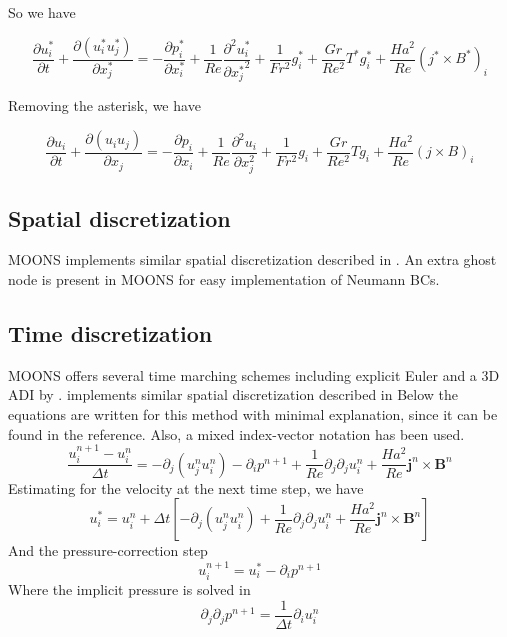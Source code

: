 \documentclass[11pt]{article}
\newcommand{\B}{\mathbf{B}}
\newcommand{\PD}{\partial}
\newcommand{\J}{\mathbf{j}}
\begin{document}
So we have

\begin{equation}
	\frac{\PD u_i^*}{\PD t} + 
	\frac{\PD (u_i^* u_j^*)}{\PD x_j^*}
	= 
	- \frac{\PD p_i^*}{\PD x_i^*}
	+ \frac{1}{Re}
	\frac{\PD^2 u_i^*}{\PD {x_j^*}^2}
	+ \frac{1}{Fr^2}
	g_i^*
	+ \frac{Gr}{Re^2}
	T^*g_i^*
	+ \frac{Ha^2}{Re}
	(j^* \times B^*)_i
\end{equation}

Removing the asterisk, we have

\begin{equation}
	\boxed{
	\frac{\PD u_i}{\PD t} + 
	\frac{\PD (u_i u_j)}{\PD x_j}
	= 
	- \frac{\PD p_i}{\PD x_i}
	+ \frac{1}{Re}
	\frac{\PD^2 u_i}{\PD x_j^2}
	+ \frac{1}{Fr^2}
	g_i
	+ \frac{Gr}{Re^2}
	T g_i
	+ \frac{Ha^2}{Re}
	(j \times B)_i
	}
\end{equation}


\subsection{Spatial discretization}
MOONS implements similar spatial discretization described in \cite{griebel1997numerical}. An extra ghost node is present in MOONS for easy implementation of Neumann BCs.

\subsection{Time discretization}
MOONS offers several time marching schemes including explicit Euler and a 3D ADI by . implements similar spatial discretization described in \cite{griebel1997numerical}
Below the equations are written for this method with minimal explanation, since it can be found in the reference. Also, a mixed index-vector notation has been used.
\begin{equation}
	\frac{u_i^{n+1}- u_i^{n}}{\Delta t} = - \PD_j (u_j^{n} u_i^{n}) 
	-\PD_i  p^{n+1} + 
	\frac{1}{Re} \PD_j \PD_j u_i^{n} + 
	\frac{Ha^2}{Re} \J^n \times \B^n
\end{equation}
Estimating for the velocity at the next time step, we have
\begin{equation}
	u_i^* = u_i^{n} + \Delta t \left[ - \PD_j (u_j^{n} u_i^{n}) + 
	\frac{1}{Re} \PD_j \PD_j u_i^{n} + 
	\frac{Ha^2}{Re} \J^n \times \B^n \right]
\end{equation}
And the pressure-correction step
\begin{equation}
	u_i^{n+1} = u_i^* -\PD_i p^{n+1}
\end{equation}
Where the implicit pressure is solved in
\begin{equation}
	\PD_j \PD_j p^{n+1} = \frac{1}{\Delta t} \PD_i u_i^n
\end{equation}




\end{document}
